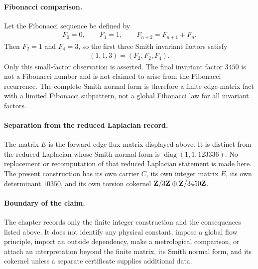 \paragraph{Fibonacci comparison.}
Let the Fibonacci sequence be defined by
$$
\begin{aligned}
F_0=0,\qquad F_1=1,\qquad F_{n+2}=F_{n+1}+F_n.
\end{aligned}
$$
Then $F_2=1$ and $F_4=3$, so the first three Smith invariant factors satisfy
$$
\begin{aligned}
(1,1,3)=(F_2,F_2,F_4).
\end{aligned}
$$
Only this small-factor observation is asserted.  The final invariant factor $3450$ is not a Fibonacci number and is not claimed to arise from the Fibonacci recurrence.  The complete Smith normal form is therefore a finite edge-matrix fact with a limited Fibonacci subpattern, not a global Fibonacci law for all invariant factors.

\paragraph{Separation from the reduced Laplacian record.}
The matrix $E$ is the forward edge-flux matrix displayed above.  It is distinct from the reduced Laplacian whose Smith normal form is $\operatorname{diag}(1,1,123336)$.  No replacement or recomputation of that reduced Laplacian statement is made here.  The present construction has its own carrier $C$, its own integer matrix $E$, its own determinant $10350$, and its own torsion cokernel ${\bf Z}/3{\bf Z}\oplus {\bf Z}/3450{\bf Z}$.

\paragraph{Boundary of the claim.}
The chapter records only the finite integer construction and the consequences listed above.  It does not identify any physical constant, impose a global flow principle, import an outside dependency, make a metrological comparison, or attach an interpretation beyond the finite matrix, its Smith normal form, and its cokernel unless a separate certificate supplies additional data.
